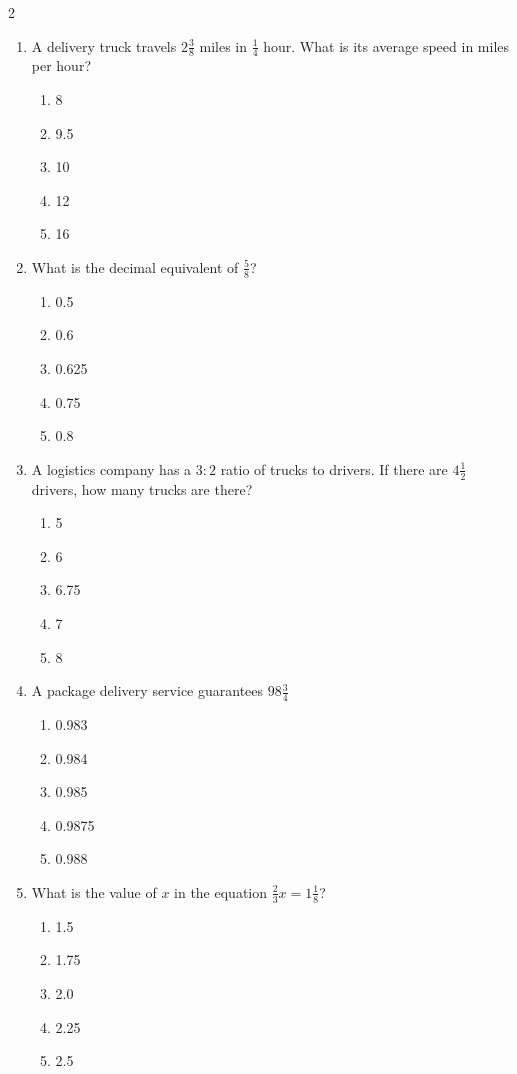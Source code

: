 \documentclass[10pt]{article}
\begin{document}
\begin{multicols}{2}
\begin{enumerate}[label=\textbf{Q\arabic*.}, leftmargin=*, itemsep=6pt, parsep=0pt]
  \item \small A delivery truck travels $2 \frac{3}{8}$ miles in $\frac{1}{4}$ hour. What is its average speed in miles per hour?
  \begin{enumerate}[label=(\Alph*), leftmargin=0.6cm, nosep, itemsep=2pt]
    \item 8
    \item 9.5
    \item 10
    \item 12
    \item 16
  \end{enumerate}

  \item \small What is the decimal equivalent of $\frac{5}{8}$?
  \begin{enumerate}[label=(\Alph*), leftmargin=0.6cm, nosep, itemsep=2pt]
    \item 0.5
    \item 0.6
    \item 0.625
    \item 0.75
    \item 0.8
  \end{enumerate}

  \item \small A logistics company has a $3:2$ ratio of trucks to drivers. If there are $4 \frac{1}{2}$ drivers, how many trucks are there?
  \begin{enumerate}[label=(\Alph*), leftmargin=0.6cm, nosep, itemsep=2pt]
    \item 5
    \item 6
    \item 6.75
    \item 7
    \item 8
  \end{enumerate}

  \item \small A package delivery service guarantees $98 \frac{3}{4}$%
  \begin{enumerate}[label=(\Alph*), leftmargin=0.6cm, nosep, itemsep=2pt]
    \item 0.983
    \item 0.984
    \item 0.985
    \item 0.9875
    \item 0.988
  \end{enumerate}

  \item \small What is the value of $x$ in the equation $\frac{2}{3}x = 1 \frac{1}{8}$?
  \begin{enumerate}[label=(\Alph*), leftmargin=0.6cm, nosep, itemsep=2pt]
    \item 1.5
    \item 1.75
    \item 2.0
    \item 2.25
    \item 2.5
  \end{enumerate}


\end{enumerate}
\end{multicols}
\end{document}
